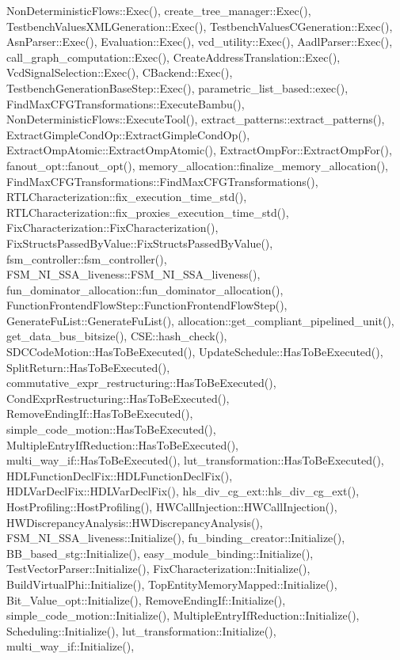 Non\+Deterministic\+Flows\+::\+Exec(), create\+\_\+tree\+\_\+manager\+::\+Exec(), Testbench\+Values\+X\+M\+L\+Generation\+::\+Exec(), Testbench\+Values\+C\+Generation\+::\+Exec(), Asn\+Parser\+::\+Exec(), Evaluation\+::\+Exec(), vcd\+\_\+utility\+::\+Exec(), Aadl\+Parser\+::\+Exec(), call\+\_\+graph\+\_\+computation\+::\+Exec(), Create\+Address\+Translation\+::\+Exec(), Vcd\+Signal\+Selection\+::\+Exec(), C\+Backend\+::\+Exec(), Testbench\+Generation\+Base\+Step\+::\+Exec(), parametric\+\_\+list\+\_\+based\+::exec(), Find\+Max\+C\+F\+G\+Transformations\+::\+Execute\+Bambu(), Non\+Deterministic\+Flows\+::\+Execute\+Tool(), extract\+\_\+patterns\+::extract\+\_\+patterns(), Extract\+Gimple\+Cond\+Op\+::\+Extract\+Gimple\+Cond\+Op(), Extract\+Omp\+Atomic\+::\+Extract\+Omp\+Atomic(), Extract\+Omp\+For\+::\+Extract\+Omp\+For(), fanout\+\_\+opt\+::fanout\+\_\+opt(), memory\+\_\+allocation\+::finalize\+\_\+memory\+\_\+allocation(), Find\+Max\+C\+F\+G\+Transformations\+::\+Find\+Max\+C\+F\+G\+Transformations(), R\+T\+L\+Characterization\+::fix\+\_\+execution\+\_\+time\+\_\+std(), R\+T\+L\+Characterization\+::fix\+\_\+proxies\+\_\+execution\+\_\+time\+\_\+std(), Fix\+Characterization\+::\+Fix\+Characterization(), Fix\+Structs\+Passed\+By\+Value\+::\+Fix\+Structs\+Passed\+By\+Value(), fsm\+\_\+controller\+::fsm\+\_\+controller(), F\+S\+M\+\_\+\+N\+I\+\_\+\+S\+S\+A\+\_\+liveness\+::\+F\+S\+M\+\_\+\+N\+I\+\_\+\+S\+S\+A\+\_\+liveness(), fun\+\_\+dominator\+\_\+allocation\+::fun\+\_\+dominator\+\_\+allocation(), Function\+Frontend\+Flow\+Step\+::\+Function\+Frontend\+Flow\+Step(), Generate\+Fu\+List\+::\+Generate\+Fu\+List(), allocation\+::get\+\_\+compliant\+\_\+pipelined\+\_\+unit(), get\+\_\+data\+\_\+bus\+\_\+bitsize(), C\+S\+E\+::hash\+\_\+check(), S\+D\+C\+Code\+Motion\+::\+Has\+To\+Be\+Executed(), Update\+Schedule\+::\+Has\+To\+Be\+Executed(), Split\+Return\+::\+Has\+To\+Be\+Executed(), commutative\+\_\+expr\+\_\+restructuring\+::\+Has\+To\+Be\+Executed(), Cond\+Expr\+Restructuring\+::\+Has\+To\+Be\+Executed(), Remove\+Ending\+If\+::\+Has\+To\+Be\+Executed(), simple\+\_\+code\+\_\+motion\+::\+Has\+To\+Be\+Executed(), Multiple\+Entry\+If\+Reduction\+::\+Has\+To\+Be\+Executed(), multi\+\_\+way\+\_\+if\+::\+Has\+To\+Be\+Executed(), lut\+\_\+transformation\+::\+Has\+To\+Be\+Executed(), H\+D\+L\+Function\+Decl\+Fix\+::\+H\+D\+L\+Function\+Decl\+Fix(), H\+D\+L\+Var\+Decl\+Fix\+::\+H\+D\+L\+Var\+Decl\+Fix(), hls\+\_\+div\+\_\+cg\+\_\+ext\+::hls\+\_\+div\+\_\+cg\+\_\+ext(), Host\+Profiling\+::\+Host\+Profiling(), H\+W\+Call\+Injection\+::\+H\+W\+Call\+Injection(), H\+W\+Discrepancy\+Analysis\+::\+H\+W\+Discrepancy\+Analysis(), F\+S\+M\+\_\+\+N\+I\+\_\+\+S\+S\+A\+\_\+liveness\+::\+Initialize(), fu\+\_\+binding\+\_\+creator\+::\+Initialize(), B\+B\+\_\+based\+\_\+stg\+::\+Initialize(), easy\+\_\+module\+\_\+binding\+::\+Initialize(), Test\+Vector\+Parser\+::\+Initialize(), Fix\+Characterization\+::\+Initialize(), Build\+Virtual\+Phi\+::\+Initialize(), Top\+Entity\+Memory\+Mapped\+::\+Initialize(), Bit\+\_\+\+Value\+\_\+opt\+::\+Initialize(), Remove\+Ending\+If\+::\+Initialize(), simple\+\_\+code\+\_\+motion\+::\+Initialize(), Multiple\+Entry\+If\+Reduction\+::\+Initialize(), Scheduling\+::\+Initialize(), lut\+\_\+transformation\+::\+Initialize(), multi\+\_\+way\+\_\+if\+::\+Initialize(), 